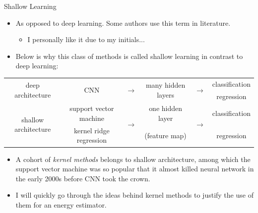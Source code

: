 \documentclass[aspectratio=169]{beamer}
\begin{document}
\begin{frame}{Shallow Learning}
  \begin{itemize}
    \item As opposed to deep learning. Some authors use this term in literature.
    \begin{itemize}
      \item I personally like it due to my initials...
    \end{itemize}
    \item Below is why this class of methods is called shallow learning in contrast to deep learning:    
  \end{itemize}
  \centering
  \scriptsize
  \begin{tabular}{c|ccccc}
    \multirow{2}{*}{deep architecture} & \multirow{2}{*}{CNN} & \multirow{2}{*}{$\longrightarrow$} & \multirow{2}{*}{many hidden layers} & \multirow{2}{*}{$\longrightarrow$} & classification    \\
    &&&&&regression\\
    \hline
    \multirow{2}{*}{shallow architecture} & support vector machine & \multirow{2}{*}{$\longrightarrow$} & one hidden layer & \multirow{2}{*}{$\longrightarrow$} & classification\\
    & kernel ridge regression & & (feature map) & & regression\\
  \end{tabular}
  \normalsize
  \begin{itemize}
    \item A cohort of \emph{kernel methods} belongs to shallow architecture, among which the support vector machine was so popular that it almost killed neural network in the early 2000s before CNN took the crown.
    \item I will quickly go through the ideas behind kernel methods to justify the use of them for an energy estimator.
  \end{itemize}
\end{frame}
\end{document}
